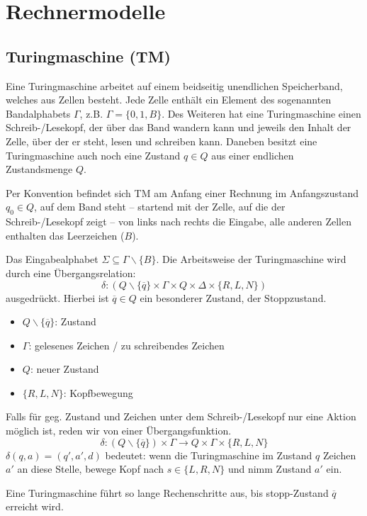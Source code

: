 \section{Rechnermodelle}

\subsection{Turingmaschine (TM)}
Eine Turingmaschine arbeitet auf einem beidseitig unendlichen Speicherband, %
welches aus Zellen besteht. Jede Zelle enthält ein Element des sogenannten Bandalphabets $\Gamma$, z.B. $\Gamma=\{ 0,1,B \}$. Des Weiteren hat eine Turingmaschine einen Schreib-/Lesekopf, der über das Band wandern kann und jeweils den Inhalt der Zelle, über der er steht, lesen und schreiben kann. Daneben besitzt eine Turingmaschine auch noch eine Zustand $q \in Q$ aus einer endlichen Zustandsmenge $Q$.

\par\medskip
Per Konvention befindet sich TM am Anfang einer Rechnung im Anfangszustand $q_0 \in Q$, auf dem Band steht -- startend mit der Zelle, auf die der Schreib-/Lesekopf zeigt -- von links nach rechts die Eingabe, alle anderen Zellen enthalten das Leerzeichen ($B$).
\par\medskip
Das Eingabealphabet $\Sigma \subseteq \Gamma \backslash \{B\}$. Die Arbeitsweise der Turingmaschine wird durch eine Übergangsrelation: $$ \delta : (Q \backslash \{ \overline{q}\} \times \Gamma \times Q \times \Delta \times \{ R,L,N \}) $$ ausgedrückt. Hierbei ist $\overline{q} \in Q$ ein besonderer Zustand, der Stoppzustand.
\par\medskip
\begin{itemize}
	\item[] $Q \backslash \{ \overline{q}\}$: Zustand
	\item[] $\Gamma$: gelesenes Zeichen / zu schreibendes Zeichen
	\item[] $Q$: neuer Zustand
	\item[] $\{ R,L,N \}$: Kopfbewegung
\end{itemize}

\par\medskip
Falls für geg. Zustand und Zeichen unter dem Schreib-/Lesekopf nur eine Aktion möglich ist, reden wir von einer Übergangsfunktion. $$ \delta : (Q \backslash \{ \overline{q}\}) \times \Gamma \rightarrow Q \times \Gamma \times \{R,L,N\} $$ $\delta(q,a)=(q',a',d)$ bedeutet: wenn die Turingmaschine im Zustand $q$ Zeichen $a'$ an diese Stelle, bewege Kopf nach $s \in \{L,R,N\}$ und nimm Zustand $a'$ ein. %
\par\medskip
Eine Turingmaschine führt so lange Rechenschritte aus, bis stopp-Zustand $\overline{q}$ erreicht wird.
\par\medskip

